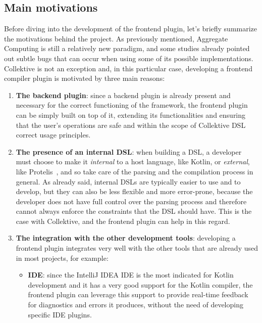 \documentclass[12pt,a4paper,openright,twoside]{book}
\begin{document}
\subsection{Main motivations}

Before diving into the development of the frontend plugin, let's briefly
summarize the motivations behind the project. As previously mentioned, Aggregate
Computing is still a relatively new paradigm, and some studies
\cite{DBLP:conf/saso/AudritoDVC16} already pointed out subtle bugs that can
occur when using some of its possible implementations. 
%
Collektive is not an exception and, in this particular case, developing a
frontend compiler plugin is motivated by three main reasons:
\begin{enumerate}
  \item \textbf{The backend plugin}: since a backend plugin is already present
  and necessary for the correct functioning of the framework, the frontend
  plugin can be simply built on top of it, extending its functionalities and
  ensuring that the user's operations are safe and within the scope of
  Collektive \ac{DSL} correct usage principles.

  \item \textbf{The presence of an internal DSL}: when building a \ac{DSL}, a
  developer must choose to make it \emph{internal} to a host language, like
  Kotlin, or \emph{external}, like Protelis~\cite{DBLP:conf/saso/PianiniBV17},
  and so take care of the parsing and the compilation process in general.
  As already said, internal \acp{DSL} are typically easier to use and to
  develop, but they can also be less flexible and more error-prone, because the
  developer does not have full control over the parsing process and therefore
  cannot always enforce the constraints that the DSL should have. This is the
  case with Collektive, and the frontend plugin can help in this regard.
  
  \item \textbf{The integration with the other development tools}: developing a
  frontend plugin integrates very well with the other tools that are already 
  used in most projects, for example:

  \begin{itemize}
    \item \textbf{IDE}: since the IntelliJ IDEA \ac{IDE} is the most indicated
    for Kotlin development and it has a very good support for the Kotlin
    compiler, the frontend plugin can leverage this support to provide real-time
    feedback for diagnostics and errors it produces, without the need of
    developing specific \ac{IDE} plugins.


\end{itemize}
\end{enumerate}
\end{document}
